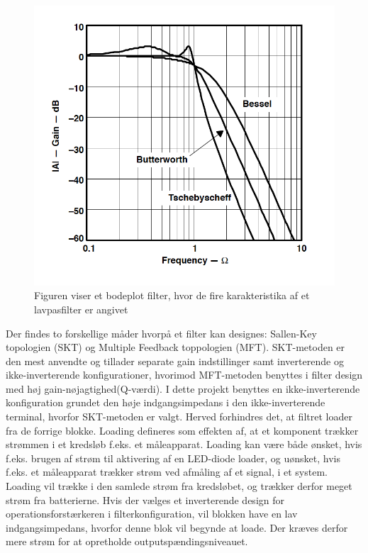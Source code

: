 \begin{figure}[H]
	\centering
	\includegraphics[scale=0.7]{figures/cProblemloesning/type_filtre.PNG}
	\caption{Figuren viser et bodeplot filter, hvor de fire karakteristika af et lavpasfilter er angivet}
	\label{fig:type_filtre}
\end{figure}

Der findes to forskellige måder hvorpå et filter kan designes: Sallen-Key topologien (SKT) og Multiple Feedback toppologien (MFT). SKT-metoden er den mest anvendte og tillader separate gain indstillinger samt inverterende og ikke-inverterende konfigurationer, hvorimod MFT-metoden benyttes i filter design med høj gain-nøjagtighed(Q-værdi). I dette projekt benyttes en ikke-inverterende konfiguration grundet den høje indgangsimpedans i den ikke-inverterende terminal, hvorfor SKT-metoden er valgt. Herved forhindres det, at filtret loader fra de forrige blokke. Loading defineres som effekten af, at et komponent trækker strømmen i et kredsløb f.eks. et måleapparat. Loading kan være både ønsket, hvis f.eks. brugen af strøm til aktivering af en LED-diode loader, og uønsket, hvis f.eks. et måleapparat trækker strøm ved afmåling af et signal, i et system. Loading vil trække i den samlede strøm fra kredsløbet, og trækker derfor meget strøm fra batterierne. Hvis der vælges et inverterende design for operationsforstærkeren i filterkonfiguration, vil blokken have en lav indgangsimpedans, hvorfor denne blok vil begynde at loade. Der kræves derfor mere strøm for at opretholde outputspændingsniveauet. \cite{Webster2009,Carter2013,Karni2014}

